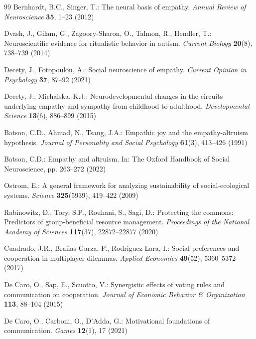 \documentclass[runningheads]{llncs}
\begin{document}
\begin{thebibliography}{99}
Bernhardt, B.C., Singer, T.: The neural basis of empathy. \textit{Annual Review of Neuroscience} \textbf{35}, 1--23 (2012)

Dvash, J., Gilam, G., Zagoory-Sharon, O., Talmon, R., Hendler, T.: Neuroscientific evidence for ritualistic behavior in autism. \textit{Current Biology} \textbf{20}(8), 738--739 (2014)

Decety, J., Fotopoulou, A.: Social neuroscience of empathy. \textit{Current Opinion in Psychology} \textbf{37}, 87--92 (2021)

Decety, J., Michalska, K.J.: Neurodevelopmental changes in the circuits underlying empathy and sympathy from childhood to adulthood. \textit{Developmental Science} \textbf{13}(6), 886--899 (2015)

Batson, C.D., Ahmad, N., Tsang, J.A.: Empathic joy and the empathy-altruism hypothesis. \textit{Journal of Personality and Social Psychology} \textbf{61}(3), 413--426 (1991)

Batson, C.D.: Empathy and altruism. In: The Oxford Handbook of Social Neuroscience, pp. 263--272 (2022)

Ostrom, E.: A general framework for analyzing sustainability of social-ecological systems. \textit{Science} \textbf{325}(5939), 419--422 (2009)

Rabinowitz, D., Tory, S.P., Rouhani, S., Sagi, D.: Protecting the commons: Predictors of group-beneficial resource management. \textit{Proceedings of the National Academy of Sciences} \textbf{117}(37), 22872--22877 (2020)

Cuadrado, J.R., Brañas-Garza, P., Rodriguez-Lara, I.: Social preferences and cooperation in multiplayer dilemmas. \textit{Applied Economics} \textbf{49}(52), 5360--5372 (2017)

De Caro, O., Sap, E., Scuotto, V.: Synergistic effects of voting rules and communication on cooperation. \textit{Journal of Economic Behavior \& Organization} \textbf{113}, 88--104 (2015)

De Caro, O., Carboni, O., D'Adda, G.: Motivational foundations of communication. \textit{Games} \textbf{12}(1), 17 (2021)


\end{thebibliography}
\end{document}
